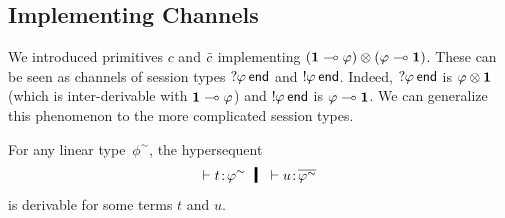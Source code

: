     \subsection{Implementing Channels}
    We introduced primitives $c$ and $\bar{c}$ implementing
    $(\mathbf{1}\multimap\varphi)\otimes(\varphi\multimap\mathbf{1})$.
    These can be seen as channels of session types
    $\mathop{?}\kern -2pt{\varphi}\hskip 2pt{\mathsf{end}}$ and $\mathop{!}\kern -2pt{\varphi}\hskip 2pt{\mathsf{end}}$.
    Indeed, $\mathop{?}\kern -2pt{\varphi}\hskip 2pt{\mathsf{end}}$ is $\varphi\otimes\mathbf{1}$ (which is
    inter-derivable with $\mathbf{1}\multimap\varphi$) and $\mathop{!}\kern -2pt{\varphi}\hskip 2pt{\mathsf{end}}$ is
    $\varphi\multimap \mathbf{1}$.
    We can generalize this phenomenon to the more complicated session
    types.
     \begin{proposition}
      For any linear type~$\phi^\sim$\kern -2pt, the hypersequent
      \[
       \tr\tj{t}{\phi^\sim}\hmid \tr\tj{u}{\overline{\phi^\sim}}
      \]
      is derivable for some terms $t$ and $u$.
     \end{proposition}
